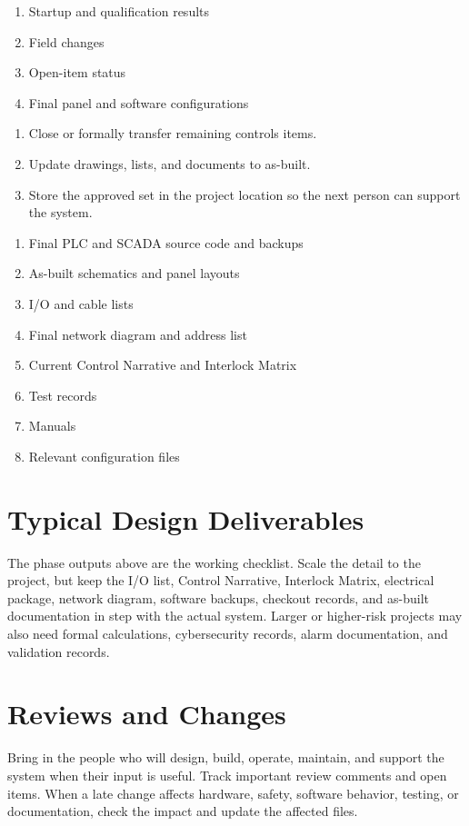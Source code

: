\begin{enumerate}[itemsep=1pt]
  \item Startup and qualification results
  \item Field changes
  \item Open-item status
  \item Final panel and software configurations
\end{enumerate}

\begin{enumerate}[itemsep=1pt]
  \item Close or formally transfer remaining controls items.
  \item Update drawings, lists, and documents to as-built.
  \item Store the approved set in the project location so the next person can support the system.
\end{enumerate}

\begin{enumerate}[itemsep=1pt]
  \item Final PLC and SCADA source code and backups
  \item As-built schematics and panel layouts
  \item I/O and cable lists
  \item Final network diagram and address list
  \item Current Control Narrative and Interlock Matrix
  \item Test records
  \item Manuals
  \item Relevant configuration files
\end{enumerate}

\section{Typical Design Deliverables}
The phase outputs above are the working checklist. Scale the detail to the project, but keep the I/O list, Control Narrative, Interlock Matrix, electrical package, network diagram, software backups, checkout records, and as-built documentation in step with the actual system. Larger or higher-risk projects may also need formal calculations, cybersecurity records, alarm documentation, and validation records.

\section{Reviews and Changes}
Bring in the people who will design, build, operate, maintain, and support the system when their input is useful. Track important review comments and open items. When a late change affects hardware, safety, software behavior, testing, or documentation, check the impact and update the affected files.